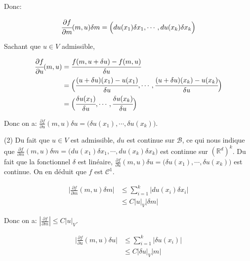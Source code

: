 \documentclass[11pt]{article}
\begin{document}
    Donc:

    \vspace{-5em}
    \begin{align*} 
      \cfrac{\partial f}{\partial m} (m, u) \delta m = \Big ( du(x_1)\delta x_1, \cdots, du(x_k)\delta x_k \Big )
    \end{align*}
    \vspace{-4em}

    Sachant que $u \in V$ admissible,

    \vspace{-4em}
    \begin{align*} 
      \cfrac{\partial f}{\partial u} (m, u) &= \cfrac{f(m, u + \delta u) - f(m,u)}{\delta u} \\
      &= \Big( \cfrac{(u+\delta u)(x_1 ) - u(x_1)}{\delta u}, \cdots, \cfrac{(u + \delta u)(x_k) - u(x_k)}{\delta u}  \Big ) \\
      &= \Big ( \cfrac{\delta u (x_1)}{\delta u}, \cdots, \cfrac{\delta u (x_k)}{\delta u} \Big )
    \end{align*}
    \vspace{-4em}

    Donc on a: $\frac{\partial f}{\partial u} (m, u) \delta u = \big(\delta u(x_1), \cdots, \delta u(x_k) \big)$.

    (2) Du fait que $u \in V$ est admissible, $du$ est continue sur $\mathscr{B}$, ce qui nous indique que $\frac{\partial f}{\partial m} (m, u) \delta m= \big (du(x_1) \delta x_1, \cdots, du(x_k) \delta x_k \big)$ est continue sur $(\mathbb{R}^d)^k$. 
    Du fait que la fonctionnel $\delta$ est linéaire, $\frac{\partial f}{\partial u} (m, u) \delta u = \big(\delta u(x_1), \cdots, \delta u (x_k) \big)$ est continue. On en déduit que $f$ est $\mathscr{C}^1$.

    \vspace{-4em}
    \begin{align*} 
      \Big|\frac{\partial f}{\partial m} (m, u) \delta m \Big| &\le \sum_{i=1}^k |du(x_i)\delta x_i| \\
      &\le C |u|_V |\delta m|
    \end{align*}
    \vspace{-4em}

    Donc on a: $|\frac{\partial f}{\partial m}| \le C|u|_V$.

    \vspace{-4em}
    \begin{align*} 
      \Big|\frac{\partial f}{\partial u} (m, u) \delta u \Big| &\le \sum_{i=1}^k |\delta u(x_i)| \\
      &\le C |\delta u|_V |m|
    \end{align*}
    \vspace{-4em}
\end{document}
